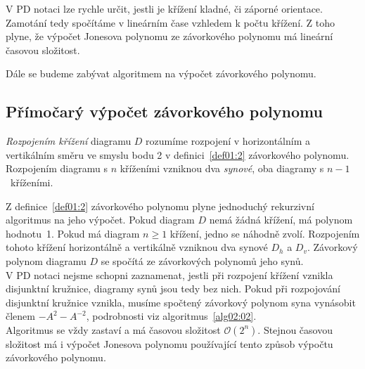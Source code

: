 V PD notaci lze rychle určit, jestli je křížení kladné, či záporné orientace. Zamotání tedy spočítáme v lineárním čase vzhledem k počtu křížení. Z toho plyne, že výpočet Jonesova polynomu ze závorkového polynomu má lineární časovou složitost.

Dále se budeme zabývat algoritmem na výpočet závorkového polynomu. 

\subsection{Přímočarý výpočet závorkového polynomu}

\begin{definice} \label{rozpoj}
\emph{Rozpojením křížení} diagramu $D$ rozumíme rozpojení v horizontálním a vertikálním směru ve smyslu bodu 2 v definici~\ref{def01:2} závorkového polynomu. Rozpojením diagramu s $n$ kříženími vzniknou dva \emph{synové}, oba diagramy s $n-1$~kříženími.
\end{definice}

Z definice~\ref{def01:2} závorkového polynomu plyne jednoduchý rekurzivní algoritmus na jeho výpočet. Pokud diagram $D$ nemá žádná křížení, má polynom hodnotu~1. Pokud má diagram $n\geq 1$ křížení, jedno se náhodně zvolí. Rozpojením tohoto křížení horizontálně a vertikálně vzniknou dva synové $D_h$ a $D_v$. Závorkový polynom diagramu $D$ se spočítá ze závorkových polynomů jeho synů.
\\
V PD notaci nejsme schopni zaznamenat, jestli při rozpojení křížení vznikla disjunktní kružnice, diagramy synů jsou tedy bez nich. Pokud při rozpojování disjunktní kružnice vznikla, musíme spočtený závorkový polynom syna vynásobit členem $-A^2 - A^{-2}$, podrobnosti viz algoritmus~\ref{alg02:02}.
\\
Algoritmus se vždy zastaví a má časovou složitost $\mathcal{O}(2^n)$. Stejnou časovou složitost má i výpočet Jonesova polynomu používající tento způsob výpočtu závorkového polynomu. 


